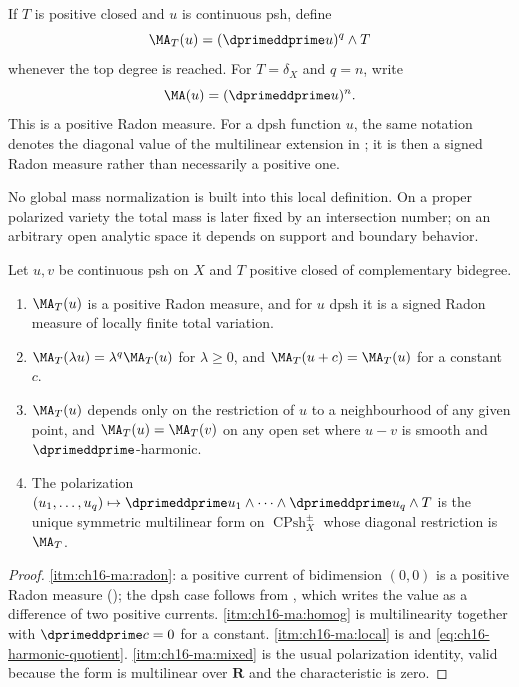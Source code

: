 \begin{definition}
\label{def:ch16-relative-ma}
If $T$ is positive closed and $u$ is continuous psh, define
\[
                         \MA_T(u)=(\dprimeddprime u)^q\wedge T
\]
whenever the top degree is reached.  For $T=\delta_X$ and $q=n$, write
\[
                         \MA(u)=(\dprimeddprime u)^n.
\]
This is a positive Radon measure.
For a dpsh function $u$, the same notation denotes the diagonal value of
the multilinear extension in ; it is then a
signed Radon measure rather than necessarily a positive one.
\end{definition}

No global mass normalization is built into this local definition.  On a
proper polarized variety the total mass is later fixed by an intersection
number; on an arbitrary open analytic space it depends on support and
boundary behavior.

\begin{proposition}
\label{prop:ch16-ma-elementary}
Let $u,v$ be continuous psh on $X$ and $T$ positive closed of complementary
bidegree.
\begin{enumerate}
\item\label{itm:ch16-ma:radon}
 $\MA_T(u)$ is a positive Radon measure, and for $u$ dpsh it is a signed
 Radon measure of locally finite total variation.
\item\label{itm:ch16-ma:homog}
 $\MA_T(\lambda u)=\lambda^q\MA_T(u)$ for $\lambda\geq0$, and
 $\MA_T(u+c)=\MA_T(u)$ for a constant $c$.
\item\label{itm:ch16-ma:local}
 $\MA_T(u)$ depends only on the restriction of $u$ to a neighbourhood of any
 given point, and $\MA_T(u)=\MA_T(v)$ on any open set where $u-v$ is smooth
 and $\dprimeddprime$-harmonic.
\item\label{itm:ch16-ma:mixed}
 The polarization
 $(u_1,\ldots,u_q)\mapsto\dprimeddprime u_1\wedge\cdots
  \wedge\dprimeddprime u_q\wedge T$ is the unique symmetric multilinear form
 on $\operatorname{CPsh}^\pm_X$ whose diagonal restriction is $\MA_T$.
\end{enumerate}
\end{proposition}

\begin{proof}
\cref{itm:ch16-ma:radon}: a positive current of bidimension $(0,0)$ is a
positive Radon measure (); the dpsh case follows from
, which writes the value as a difference of two
positive currents.  \cref{itm:ch16-ma:homog} is multilinearity together with
$\dprimeddprime c=0$ for a constant.  \cref{itm:ch16-ma:local} is
 and \eqref{eq:ch16-harmonic-quotient}.
\cref{itm:ch16-ma:mixed} is the usual polarization identity, valid because
the form is multilinear over $\mathbf R$ and the characteristic is zero.
\end{proof}

